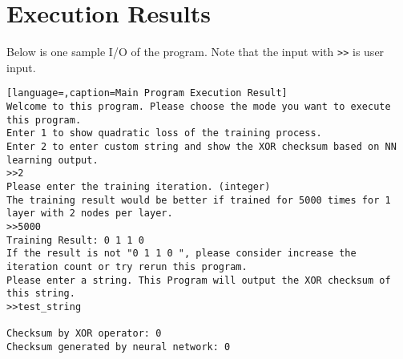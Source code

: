 	\section{Execution Results}
	Below is one sample I/O of the program. Note that the input with \lstinline{>>} is user input. 
	 \begin{lstlisting}[language=,caption=Main Program Execution Result]
Welcome to this program. Please choose the mode you want to execute this program.
Enter 1 to show quadratic loss of the training process.
Enter 2 to enter custom string and show the XOR checksum based on NN learning output.
>>2
Please enter the training iteration. (integer)
The training result would be better if trained for 5000 times for 1 layer with 2 nodes per layer.
>>5000
Training Result: 0 1 1 0 
If the result is not "0 1 1 0 ", please consider increase the iteration count or try rerun this program.
Please enter a string. This Program will output the XOR checksum of this string.
>>test_string

Checksum by XOR operator: 0
Checksum generated by neural network: 0   \end{lstlisting}
